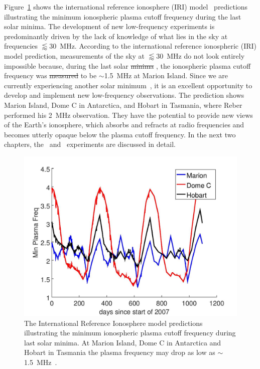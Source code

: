 Figure~\ref{fig:IRI_model} shows the international reference ionosphere (IRI) model~\citep{ars-16-1-2018} predictions illustrating the minimum ionospheric plasma cutoff frequency during the last solar minima. The development of new low-frequency experiments is predominantly driven by the lack of knowledge of what lies in the sky at frequencies $\lessapprox$\SI{30}{\mega\hertz}.  According to the international reference ionospheric (IRI) model prediction, measurements of the sky at $\lessapprox$\SI{30}{\mega\hertz} do not look entirely impossible because, during the last solar \st{minima} , the ionospheric plasma cutoff frequency was \st{measured}  to be $\sim$\SI{1.5}{\mega\hertz} at Marion Island. Since we are currently experiencing another solar minimum~\citep{2018NatCo...9.5209B}, it is an excellent opportunity to develop and implement new low-frequency observations. The prediction shows Marion Island, Dome C in Antarctica, and Hobart in Tasmania, where Reber performed his \SI{2}{\mega\hertz} observation. They have the potential to provide new views of the Earth's ionosphere, which absorbs and refracts at radio frequencies and becomes utterly opaque below the plasma cutoff frequency.  In the next two chapters, the \prizm\ and \albatros\ experiments are discussed in detail.

\begin{figure}
	\centering
	\includegraphics[width=\linewidth]{Figures/IRI_model}
	\caption{The International Reference Ionosphere model predictions illustrating the minimum ionospheric plasma cutoff frequency during last solar minima. At Marion Island, Dome C in Antarctica and Hobart in Tasmania the plasma frequency may drop as low as $\sim$\SI{1.5}{\mega\hertz}~\citep{2020arXiv200812208C}.}
	\label{fig:IRI_model}
\end{figure}
